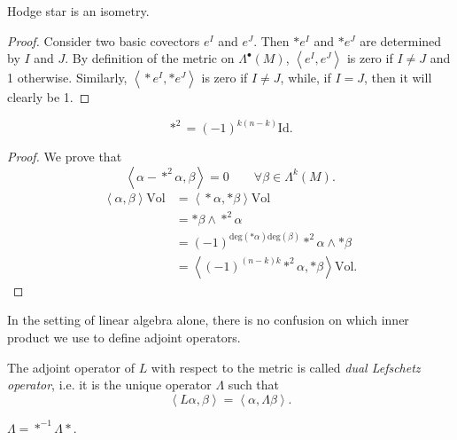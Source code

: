 \documentclass{book}
\begin{document}
\begin{lemma}
\label{lemma-hodge-star-isometry}
Hodge star is an isometry.
\end{lemma}

\begin{proof}
Consider two basic covectors $e^I$ and $e^J$.
Then $*e^I$ and $*e^J$ are determined by $I$
and $J$.
By definition of the metric on
$\Lambda^\bullet(M)$,
$\left\langle{}e^I,e^J\right\rangle{}$ is zero if $I\neq J$
and 1 otherwise.
Similarly, $\left\langle{}*e^I,*e^J\right\rangle{}$ is zero
if $I\neq J$,
while, if $I=J$, then it will clearly be 1.
\end{proof}

\begin{lemma}
\label{lemma-hodge-star-squared}
\begin{reference}
\cite[Lemma 5.5]{voi}
\end{reference}
$$
*^2=(-1)^{k(n-k)}\text{Id}.
$$
\end{lemma}

\begin{proof}
We prove that
$$
\left\langle{}\alpha-*^2\alpha,\beta\right\rangle{}=0\qquad
\forall \beta \in \Lambda^k(M).
$$
$$
\begin{aligned}
\left\langle{}\alpha,\beta\right\rangle{}\text{Vol}
&=\left\langle{}*\alpha,*\beta\right\rangle{}\text{Vol}\\
&=*\beta\wedge *^2\alpha\\
&=(-1)^{\text{deg}(*\alpha)
\text{deg}(\beta)}*^2\alpha\wedge *\beta\\
&=\left\langle{}(-1)^{(n-k)k}*^2\alpha,
*\beta\right\rangle{}\text{Vol}.
\end{aligned}
$$
\end{proof}

\noindent
In the setting of linear algebra alone,
there is no confusion on which inner product
we use to define adjoint operators.

\begin{definition}
\label{definition-dual-lefschetz}
The adjoint operator of $L$ with respect to
the metric
is called {\it dual Lefschetz operator}, i.e.
it is
the unique operator $\Lambda$ such that
$$
\left\langle{}L \alpha,\beta\right\rangle{}=\left\langle{}\alpha,
\Lambda \beta\right\rangle{}.
$$
\end{definition}

\begin{exercise}
\label{exercise-dual-lefsc-hodge-twist}
$\Lambda=*^{-1}\Lambda *$.
\end{exercise}
\end{document}
